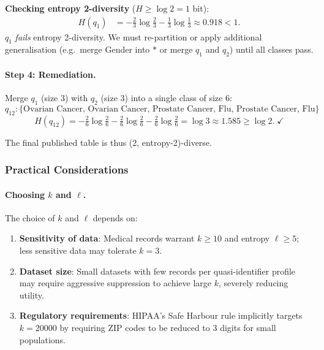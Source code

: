 \textbf{Checking entropy 2-diversity} ($H \geq \log 2 = 1$ bit):
\begin{align*}
  H(q_1) &= -\tfrac{2}{3}\log\tfrac{2}{3} - \tfrac{1}{3}\log\tfrac{1}{3} \approx 0.918 < 1.
\end{align*}
$q_1$ \emph{fails} entropy 2-diversity. We must re-partition or apply additional generalisation (e.g.\ merge Gender into $*$ or merge $q_1$ and $q_2$) until all classes pass.

\paragraph{Step 4: Remediation.}
Merge $q_1$ (size 3) with $q_2$ (size 3) into a single class of size 6:
\[
  q_{12}: \{\text{Ovarian Cancer, Ovarian Cancer, Prostate Cancer, Flu, Prostate Cancer, Flu}\}
\]
\[
  H(q_{12}) = -\tfrac{2}{6}\log\tfrac{2}{6} - \tfrac{2}{6}\log\tfrac{2}{6} - \tfrac{2}{6}\log\tfrac{2}{6} = \log 3 \approx 1.585 \geq \log 2. \; \checkmark
\]

The final published table is thus (2, entropy-2)-diverse.

\subsubsection{Practical Considerations}
\label{sec:practical_considerations}

\paragraph{Choosing $k$ and $\ell$.}
The choice of $k$ and $\ell$ depends on:
\begin{enumerate}
  \item \textbf{Sensitivity of data}: Medical records warrant $k \geq 10$ and entropy $\ell \geq 5$; less sensitive data may tolerate $k = 3$.
  \item \textbf{Dataset size}: Small datasets with few records per quasi-identifier profile may require aggressive suppression to achieve large $k$, severely reducing utility.
  \item \textbf{Regulatory requirements}: HIPAA's Safe Harbour rule implicitly targets $k = 20000$ by requiring ZIP codes to be reduced to 3 digits for small populations.
\end{enumerate}

